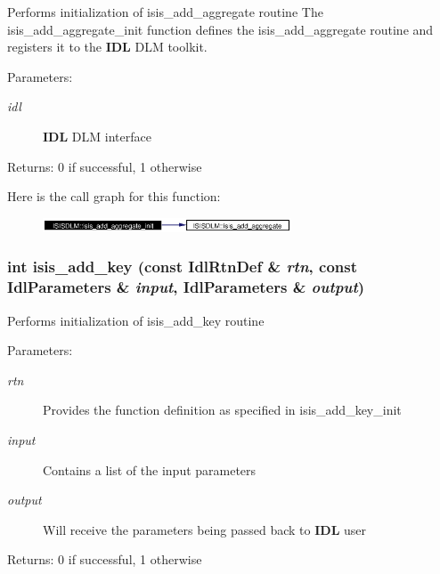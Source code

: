 Performs initialization of isis\_\-add\_\-aggregate routine The isis\_\-add\_\-aggregate\_\-init function defines the isis\_\-add\_\-aggregate routine and registers it to the {\bf IDL} DLM toolkit. \begin{Desc}
\item[Parameters:]
\begin{description}
\item[{\em idl}]{\bf IDL} DLM interface \end{description}
\end{Desc}
\begin{Desc}
\item[Returns:]0 if successful, 1 otherwise \end{Desc}


Here is the call graph for this function:\begin{figure}[H]
\begin{center}
\leavevmode
\includegraphics[width=209pt]{namespaceISISDLM_a7_cgraph}
\end{center}
\end{figure}
\subsubsection{\setlength{\rightskip}{0pt plus 5cm}int isis\_\-add\_\-key (const Idl\-Rtn\-Def \& {\em rtn}, const Idl\-Parameters \& {\em input}, Idl\-Parameters \& {\em output})}\label{namespaceISISDLM_a10}


Performs initialization of isis\_\-add\_\-key routine \begin{Desc}
\item[Parameters:]
\begin{description}
\item[{\em rtn}]Provides the function definition as specified in isis\_\-add\_\-key\_\-init \item[{\em input}]Contains a list of the input parameters \item[{\em output}]Will receive the parameters being passed back to {\bf IDL} user \end{description}
\end{Desc}
\begin{Desc}
\item[Returns:]0 if successful, 1 otherwise \end{Desc}
